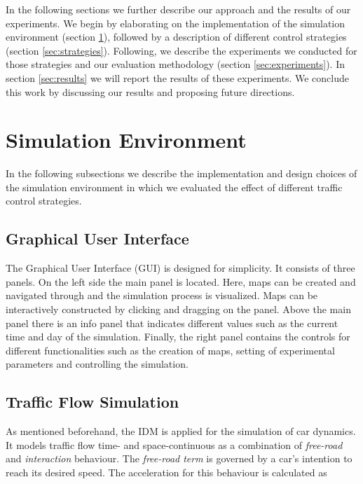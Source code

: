 \documentclass[10pt]{article}
\begin{document}
\vspace{20pt}

In the following sections we further describe our approach and the results of our experiments. We begin by elaborating on the implementation of the simulation environment (section \ref{sec:envi}), followed by a description of different control strategies (section \ref{sec:strategies}). Following, we describe the experiments we conducted for those strategies and our evaluation methodology (section \ref{sec:experiments}). In section \ref{sec:results} we will report the results of these experiments. We conclude this work by discussing our results and proposing future directions.
	
\section{Simulation Environment}
\label{sec:envi}
In the following subsections we describe the implementation and design choices of the simulation environment in which we evaluated the effect of different traffic control strategies.

\subsection{Graphical User Interface}
The Graphical User Interface (GUI) is designed for simplicity. It consists of three  panels. On the left side the main panel is located. Here, maps can be created and navigated through and the simulation process is visualized. Maps can be interactively constructed by clicking and dragging on the panel. Above the main panel there is an info panel that indicates different values such as the current time and day of the simulation. Finally, the right panel contains the controls for different functionalities such as the creation of maps, setting of experimental parameters and controlling the simulation.
	
\subsection{Traffic Flow Simulation}
As mentioned beforehand, the IDM \citep{treiber2000congested} is applied for the simulation of car dynamics. It models traffic flow time- and space-continuous as a combination of \textit{free-road} and \textit{interaction} behaviour. The \textit{free-road term} is governed by a car's intention to reach its desired speed. The acceleration for this behaviour is calculated \citep{treiber2000congested} as
\end{document}
